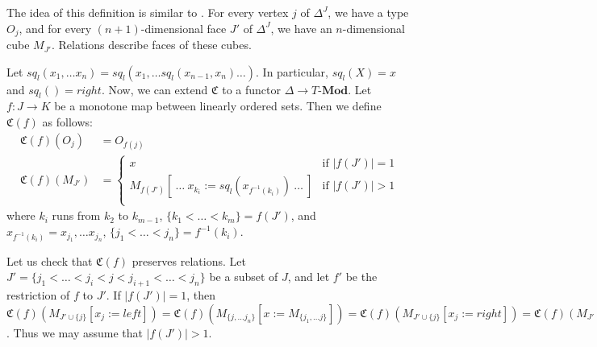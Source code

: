 \documentclass[reqno]{amsart}
\theoremstyle{definition}
\theoremstyle{remark}
\newcommand{\repl}{:=}
\newcommand{\cat}[1]{\mathbf{#1}}
\newcommand{\Mod}[1]{#1\text{-}\cat{Mod}}
\numberwithin{figure}{section}
\begin{document}
The idea of this definition is similar to \cite[Definition~1.1.5.1]{lurie-topos}.
For every vertex $j$ of $\Delta^J$, we have a type $O_j$,
and for every $(n+1)$-dimensional face $J'$ of $\Delta^J$, we have an $n$-dimensional cube $M_{J'}$.
Relations describe faces of these cubes.

Let $sq_l(x_1, \ldots x_n) = sq_l(x_1, \ldots sq_l(x_{n-1},x_n) \ldots )$.
In particular, $sq_l(X) = x$ and $sq_l() = right$.
Now, we can extend $\mathfrak{C}$ to a functor $\Delta \to \Mod{T}$.
Let $f : J \to K$ be a monotone map between linearly ordered sets.
Then we define $\mathfrak{C}(f)$ as follows:
\begin{align*}
\mathfrak{C}(f)(O_j) & = O_{f(j)} \\
\mathfrak{C}(f)(M_{J'}) & =
\begin{cases}
    x                                                                  & \text{if } |f(J')| = 1 \\
    M_{f(J')}[\ \ldots\ x_{k_i} \repl sq_l(x_{f^{-1}(k_i)})\ \ldots\ ] & \text{if } |f(J')| > 1 \\
\end{cases}
\end{align*}
where $k_i$ runs from $k_2$ to $k_{m-1}$, $\{ k_1 < \ldots < k_m \} = f(J')$,
and $x_{f^{-1}(k_i)} = x_{j_1}, \ldots x_{j_n}$, $\{ j_1 < \ldots < j_n \} = f^{-1}(k_i)$.

Let us check that $\mathfrak{C}(f)$ preserves relations.
Let $J' = \{ j_1 < \ldots < j_i < j < j_{i+1} < \ldots < j_n \}$ be a subset of $J$, and let $f'$ be the restriction of $f$ to $J'$.
If $|f(J')| = 1$, then $\mathfrak{C}(f)(M_{J' \cup \{j\}}[x_j \repl left]) = \mathfrak{C}(f)(M_{\{ j, \ldots j_n \}}[x \repl M_{\{ j_1, \ldots j \}}]) = \mathfrak{C}(f)(M_{J' \cup \{j\}}[x_j \repl right]) = \mathfrak{C}(f)(M_{J'}) = x$.
Thus we may assume that $|f(J')| > 1$. 
\end{document}
